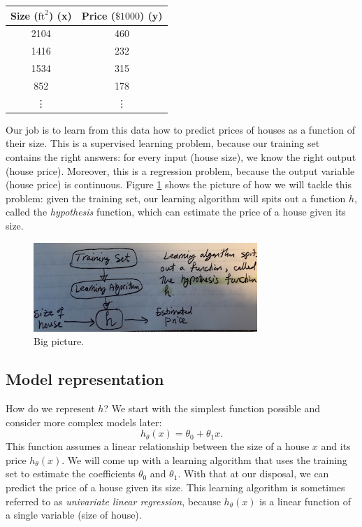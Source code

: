 \documentclass{article}
\theoremstyle{definition}
\begin{document}
\begin{center}
\begin{tabular}{ |c|c| } 
 \hline
 Size ($\text{ft}^2$) (x) & Price ($\$1000$) (y) \\
 \hline
 2104 & 460 \\
 1416 & 232 \\
 1534 & 315 \\
 852 & 178 \\
 \vdots & \vdots \\
 \hline
\end{tabular}
\end{center}

Our job is to learn from this data how to predict prices of houses as a function of their size. This is a supervised learning problem, because our training set contains the right answers: for every input (house size), we know the right output (house price). Moreover, this is a regression problem, because the output variable (house price) is continuous. Figure \ref{linreg-bigpic} shows the picture of how we will tackle this problem: given the training set, our learning algorithm will spits out a function $h$, called the \textit{hypothesis} function, which can estimate the price of a house given its size.

\begin{figure}[ht]
\centering
\includegraphics[scale=0.8]{images/lin_reg/big-picture.jpg}
\caption{Big picture.}
\label{linreg-bigpic}
\end{figure}

\subsection{Model representation}
How do we represent $h$? We start with the simplest function possible and consider more complex models later:
\begin{equation}
    h_{\theta}(x) = \theta_0 + \theta_1 x.
    \label{linreg-eq:univar-hypothesis}
\end{equation}
This function assumes a linear relationship between the size of a house $x$ and its price $h_{\theta}(x)$. We will come up with a learning algorithm that uses the training set to estimate the coefficients $\theta_0$ and $\theta_1$. With that at our disposal, we can predict the price of a house given its size. This learning algorithm is sometimes referred to as \textit{univariate linear regression}, because $h_{\theta}(x)$ is a linear function of a single variable (size of house).
\end{document}
